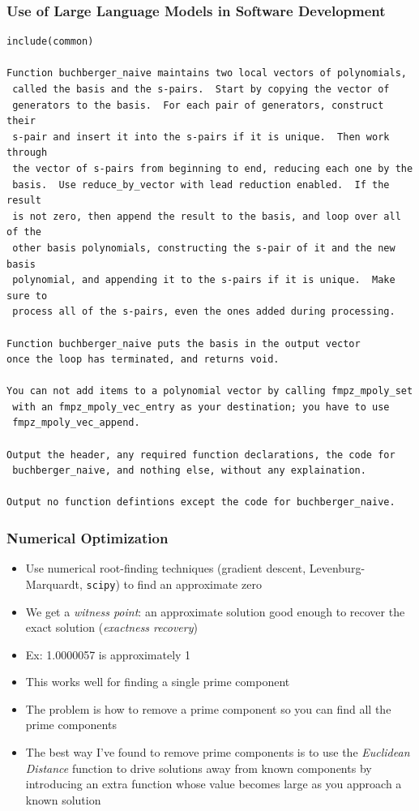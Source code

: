 \documentclass{beamer}
\begin{document}
\begin{frame}[fragile]
\frametitle{Use of Large Language Models in Software Development}
\scriptsize
\begin{verbatim}
include(common)

Function buchberger_naive maintains two local vectors of polynomials,
 called the basis and the s-pairs.  Start by copying the vector of
 generators to the basis.  For each pair of generators, construct their
 s-pair and insert it into the s-pairs if it is unique.  Then work through
 the vector of s-pairs from beginning to end, reducing each one by the
 basis.  Use reduce_by_vector with lead reduction enabled.  If the result
 is not zero, then append the result to the basis, and loop over all of the
 other basis polynomials, constructing the s-pair of it and the new basis
 polynomial, and appending it to the s-pairs if it is unique.  Make sure to
 process all of the s-pairs, even the ones added during processing.

Function buchberger_naive puts the basis in the output vector
once the loop has terminated, and returns void.

You can not add items to a polynomial vector by calling fmpz_mpoly_set
 with an fmpz_mpoly_vec_entry as your destination; you have to use
 fmpz_mpoly_vec_append.

Output the header, any required function declarations, the code for
 buchberger_naive, and nothing else, without any explaination.

Output no function defintions except the code for buchberger_naive.
\end{verbatim}
\end{frame}

\begin{frame}
\frametitle{Numerical Optimization}
\begin{itemize}
\item Use numerical root-finding techniques (gradient descent, Levenburg-Marquardt, {\tt scipy}) to find an approximate zero
\item We get a {\it witness point}: an approximate solution good enough to recover the exact solution ({\it exactness recovery})
\item Ex: 1.0000057 is approximately 1
\item This works well for finding a single prime component
\item The problem is how to remove a prime component so you can find all the prime components
\item The best way I've found to remove prime components is to use the {\it Euclidean Distance} function
to drive solutions away from known components by introducing an extra function whose value becomes large
as you approach a known solution
\end{itemize}
\end{frame}
\end{document}
